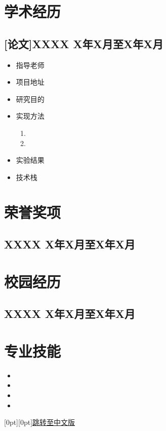\documentclass[a4paper,10pt]{article}
\begin{document}
\section*{学术经历}
\subsection*{[论文]XXXX \hfill X年X月至X年X月}
\begin{itemize}
    \item 指导老师 
    \item 项目地址 
    \item 研究目的
    \item 实现方法
    \begin{enumerate}
        \item 
        \item 
    \end{enumerate}
    \item 实验结果
    \item 技术栈
\end{itemize}


\section*{荣誉奖项}
\subsection*{XXXX \hfill X年X月至X年X月 }

\section*{校园经历}
\subsection*{XXXX \hfill X年X月至X年X月}

\section*{专业技能}
\begin{itemize}
    \item 
    \item
    \item 
    \item 
\end{itemize}

\newpage %

\hspace*{-2.5em} 
\vspace*{2.5em}
\raisebox{0pt}[0pt][0pt]{\hyperref[中文版]{\small{跳转至中文版}}}
\vspace*{-\baselineskip}
\end{document}
